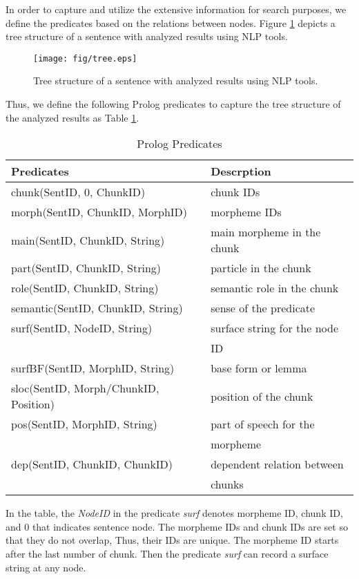 \documentclass[conference]{IEEEtran}
\begin{document}
In order to capture and utilize the extensive information for search purposes, 
we define the predicates
based on the relations between nodes. Figure \ref{fig:tree} depicts a tree structure of
a sentence with analyzed results using NLP tools. 

\begin{figure}[htbp]
\centerline{\texttt{[image: fig/tree.eps]}}
\caption{Tree structure of a sentence with analyzed results using NLP tools.} 
\label{fig:tree}
\end{figure}

Thus, we define the following Prolog predicates to capture the tree structure of
the analyzed results as Table \ref{tbl:predicates}. 

\begin{table}[htbp]
\caption{Prolog Predicates}
\begin{center}
  \begin{tabular}{|l|l|}\hline
      Predicates &  Descrption \\\hline
      chunk(SentID, 0, ChunkID) & chunk IDs  \\
      morph(SentID, ChunkID, MorphID) & morpheme IDs \\  
      main(SentID, ChunkID, String) & main morpheme in the chunk\\
      part(SentID, ChunkID, String) & particle in the chunk \\
      role(SentID, ChunkID, String) & semantic role in the chunk \\
      semantic(SentID, ChunkID, String) & sense of the predicate \\
      surf(SentID, NodeID, String) & surface string for the node\\
                       & ID \\
      surfBF(SentID, MorphID, String) & base form or lemma \\
      sloc(SentID, Morph/ChunkID, Position) & position of the chunk\\
      pos(SentID, MorphID, String) & part of speech for the \\
                                   &  morpheme\\
      dep(SentID, ChunkID, ChunkID) & dependent relation between \\
                        & chunks\\\hline
\end{tabular}
\label{tbl:predicates}
\end{center}
\end{table}
In the table, the {\it NodeID} in the predicate {\it surf} denotes
morpheme ID, chunk ID, and 0 that indicates sentence node.
The morpheme IDs and chunk IDs are set so that they do not overlap,
Thus, their IDs are unique. The morpheme ID starts after the last number
of chunk. Then the predicate {\it surf} can
record a surface string at any node.
\end{document}
